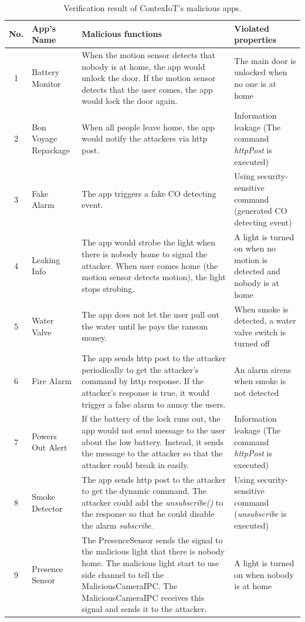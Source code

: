 \begin{table}[!tb]
\scriptsize
\ssp
\caption{Verification result of ContexIoT's malicious apps.}
\label{ContexIoT_apps}
\centering
{
\begin{tabular}{| c | p{1.8cm} | p{6.5cm} | p{3.9cm} |}
\hline
{\bf No.} & {\bf App's Name} & {\bf Malicious functions} & {\bf Violated properties}\\
\hline
1 & Battery Monitor & When the motion sensor detects that nobody is at home, the app would unlock the door. If the motion sensor detects that the user comes, the app would lock the door again. & The main door is unlocked when no one is at home\\
\hline
2 & Bon Voyage Repackage & When all people leave home, the app would notify the attackers via http post. & Information leakage (The command \textit{httpPost} is executed)\\
\hline
3 & Fake Alarm & The app triggers a fake CO detecting event. & Using security-sensitive command (generated CO detecting event)\\
\hline
4 & Leaking Info & The app would strobe the light when there is nobody home to signal the attacker. When user comes home (the motion sensor detects motion), the light stops strobing. & A light is turned on when no motion is detected and nobody is at home\\
\hline
5 & Water Valve &  The app does not let the user pull out the water until he pays the ransom money. & When smoke is detected, a water valve switch is turned off\\
\hline
6 & Fire Alarm & The app sends http post to the attacker periodically to get the attacker's command by http response. If the attacker's response is true, it would trigger a false alarm to annoy the users. & An alarm sirens when smoke is not detected\\
\hline
7 & Powers Out Alert & If the battery of the lock runs out, the app would not send message to the user about the low battery. Instead, it sends the message to the attacker so that the attacker could break in easily. & Information leakage (The command \textit{httpPost} is executed)\\
\hline
8 & Smoke Detector & The app sends http post to the attacker to get the dynamic command. The attacker could add the \textit{unsubscribe()} to the response so that he could disable the alarm \textit{subscribe}. & Using security-sensitive command (\textit{unsubscribe} is executed)\\
\hline
9 & Presence Sensor & The PresenceSensor sends the signal to the malicious light that there is nobody home. The malicious light start to use side channel to tell the MaliciousCameraIPC. The MaliciousCameraIPC receives this signal and sends it to the attacker. & A light is turned on when nobody is at home\\
\hline
\end{tabular}
}
\end{table}


